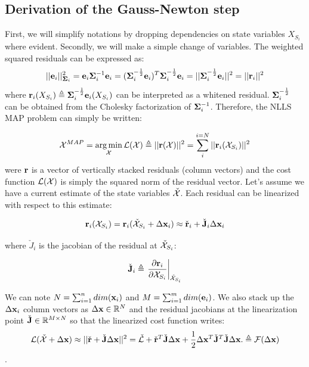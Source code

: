 \subsection{Derivation of the Gauss-Newton step}
First, we will simplify notations by dropping dependencies on state variables $X_{S_i}$ where evident. 
Secondly, we will make a simple change of variables. The weighted squared residuals can be expressed as:
\begin{equation}
    ||{\bf e}_i||^2_{{\bm \Sigma}_i} = {\bf e}_i {\bm \Sigma}_i^{-1} {\bf e}_i 
    = ({\bm \Sigma}_i^{-\frac{1}{2}}{\bf e}_i)^T{\bm \Sigma}_i^{-\frac{1}{2}}{\bf e}_i
    = ||{\bm \Sigma}_i^{-\frac{1}{2}}{\bf e}_i||^2 = ||{\bf r}_i||^2
\end{equation}
where ${\bf r}_i(X_{S_i}) \triangleq {\bm \Sigma}_i^{-\frac{1}{2}}{\bf e}_i(X_{S_i})$ can be interpreted as a whitened residual. ${\bm \Sigma}_i^{-\frac{1}{2}}$ can be obtained
from the Cholesky factorization of ${\bm \Sigma}_i^{-1}$. Therefore, the NLLS MAP problem can simply be written:

\begin{equation}
    \mathcal{X}^{MAP} = \operatorname*{arg\,min}_{\mathcal{X}} \mathcal{L}(\mathcal{X}) \triangleq||{\bf r}(\mathcal{X})||^2 = \sum_i^{i=N} ||{\bf r}_i({\mathcal{X}_{S_i}})||^2 
\end{equation}
were ${\bf r}$ is a vector of vertically stacked residuals (column vectors) and the cost function $\mathcal{L}(\mathcal{X})$ is simply the squared norm 
of the residual vector. Let's assume we have a current estimate of the state variables $\check{\mathcal{X}}$.
Each residual can be linearized with respect to this estimate:

\begin{equation}
    {\bf r}_i(\mathcal{X}_{S_i}) = {\bf r}_i(\check{\mathcal{X}}_{S_i} + \Delta {\bf x}_i) \approx \check{{\bf r}}_i + \check{{\bf J}}_i \Delta {\bf x}_i
\end{equation}

where $\check{J}_i$ is the jacobian of the residual at $\check{\mathcal{X}}_{S_i}$: 

\begin{equation}
    \check{{\bf J}}_i \triangleq \left.\frac{\partial {\bf r}_i}{\partial \mathcal{X}_{S_i}}\right|_{\check{\mathcal{X}}_{S_i}}
    \label{eq:res_jacobian}
\end{equation}

We can note $N = \sum_{i=1}^{n}dim({\bf x}_i)$ and $M = \sum_{i=1}^{m}dim({\bf e}_i)$.
We also stack up the $\Delta {\bf x}_i$ column vectors as $\Delta {\bf x} \in \mathbb{R}^N$ and the residual jacobians at the linearization point 
$\check{{\bf J}} \in \mathbb{R}^{M \times N}$ so that the linearized cost function writes:  
%
\begin{equation}
    \mathcal{L}(\check{\mathcal{X}} + \Delta {\bf x}) 
    \approx ||\check{{\bf r}} + \check{{\bf J}} \Delta {\bf x}||^2 
    = \check{\mathcal{L}} +  \check{{\bf r}}^T \check{{\bf J}} \Delta {\bf x} + \frac{1}{2}\Delta {\bf x}^T \check{{\bf J}}^T \check{{\bf J}} \Delta {\bf x} .
    \triangleq \mathcal{F}(\Delta {\bf x})
\end{equation}.

